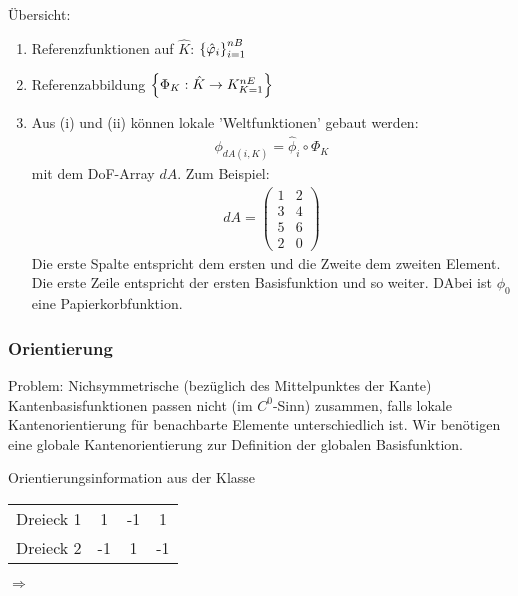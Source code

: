 Übersicht:
\enu{\roman} 
\begin{enumerate}
\item Referenzfunktionen auf $\hat K$: $\left\{ \hat {\varphi}_i \right\}_{i = 1}^{nB}$
\item Referenzabbildung $\left\{ \Phi_K: \hat K \to K_{K = 1}^{nE} \right\}$
\item Aus (i) und (ii) können lokale 'Weltfunktionen' gebaut werden:
  \begin{align*}
    \phi_{dA(i, K)} = \hat \phi_i \circ \Phi_K
  \end{align*}
mit dem DoF-Array $dA$. Zum Beispiel:
\begin{align*}
  dA =
  \begin{pmatrix}
    1 & 2\\
    3 & 4\\
    5 & 6\\
    2 & 0
  \end{pmatrix}
\end{align*}
Die erste Spalte entspricht dem ersten und die Zweite dem zweiten Element. Die erste Zeile entspricht der ersten Basisfunktion und so weiter. DAbei ist $\phi_0$ eine Papierkorbfunktion.   
\end{enumerate}
\subsubsection{Orientierung}
Problem: Nichsymmetrische (bezüglich des Mittelpunktes der Kante) Kantenbasisfunktionen passen nicht (im $C^0$-Sinn) zusammen, falls lokale Kantenorientierung für benachbarte Elemente unterschiedlich ist. Wir benötigen eine globale Kantenorientierung zur Definition der globalen Basisfunktion. 

Orientierungsinformation aus der  Klasse

\begin{tabular}{c c c c}
  Dreieck 1 & 1 &-1&1 \\
  Dreieck 2 & -1 &1&-1 
\end{tabular} $\Rightarrow$ 


